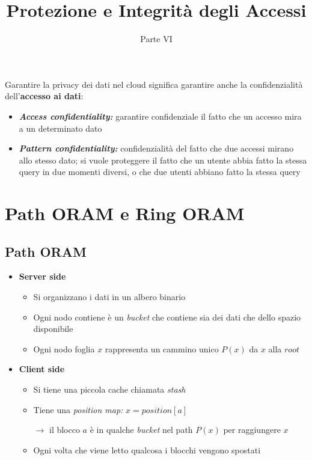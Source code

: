 \documentclass{report}
\title{Protezione e Integrità degli Accessi}
\date{Parte VI}
\begin{document}
\maketitle

\tableofcontents
\newpage

Garantire la privacy dei dati nel cloud significa garantire anche 
la confidenzialità dell'\textbf{accesso ai dati}:
\begin{itemize}
    \item \textbf{\textit{Access confidentiality:}} garantire confidenziale il fatto 
    che un accesso mira a un determinato dato
    \item \textbf{\textit{Pattern confidentiality:}} confidenzialità del fatto che due accessi 
    mirano allo stesso dato; si vuole proteggere il fatto che un utente abbia fatto la stessa query in due 
    momenti diversi, o che due utenti abbiano fatto la stessa query
\end{itemize}

\chapter{Path ORAM e Ring ORAM}
\section{Path ORAM}

\begin{itemize}
    \item \textbf{Server side}
    \begin{itemize}
        \item Si organizzano i dati in un albero binario 
        \item Ogni nodo contiene è un \textit{bucket} che contiene sia dei dati che dello spazio disponibile 
        \item Ogni nodo foglia $x$ rappresenta un cammino unico $P(x)$ da $x$ alla $root$
    \end{itemize}
    \item \textbf{Client side}
    \begin{itemize}
        \item Si tiene una piccola cache chiamata \textit{stash}
        \item Tiene una \textit{position map:} $x = position[a]$
        
        $\rightarrow$ il blocco $a$ è in qualche \textit{bucket} nel path $P(x)$
        per raggiungere $x$
        \item Ogni volta che viene letto qualcosa i blocchi vengono spostati
    \end{itemize}
\end{itemize}
\end{document}

